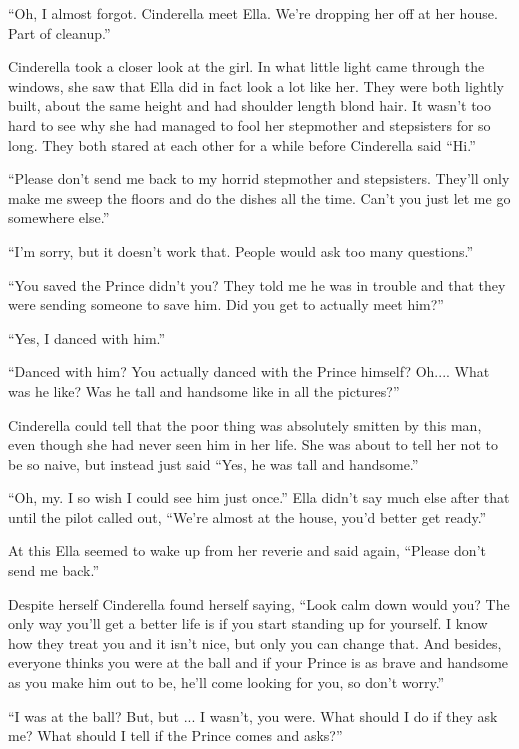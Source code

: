 \documentclass[11pt,letterpaper]{article}
\begin{document}
``Oh, I almost forgot. Cinderella meet Ella. We're dropping her off at her house. Part of cleanup.''

Cinderella took a closer look at the girl. In what little light came through the windows, she saw that Ella did in fact look a lot like her. They were both lightly built, about the same height and had shoulder length blond hair. It wasn't too hard to see why she had managed to fool her stepmother and stepsisters for so long. They both stared at each other for a while before Cinderella said ``Hi.''

``Please don't send me back to my horrid stepmother and stepsisters. They'll only make me sweep the floors and do the dishes all the time. Can't you just let me go somewhere else.''

``I'm sorry, but it doesn't work that. People would ask too many questions.''

``You saved the Prince didn't you? They told me he was in trouble and that they were sending someone to save him. Did you get to actually meet him?''

``Yes, I danced with him.''

``Danced with him? You actually danced with the Prince himself? Oh.... What was he like? Was he tall and handsome like in all the pictures?''

Cinderella could tell that the poor thing was absolutely smitten by this man, even though she had never seen him in her life. She was about to tell her not to be so naive, but instead just said ``Yes, he was tall and handsome.''

``Oh, my. I so wish I could see him just once.'' Ella didn't say much else after that until the pilot called out, ``We're almost at the house, you'd better get ready.''

At this Ella seemed to wake up from her reverie and said again, ``Please don't send me back.''

Despite herself Cinderella found herself saying, ``Look calm down would you? The only way you'll get a better life is if you start standing up for yourself. I know how they treat you and it isn't nice, but only you can change that.  And besides, everyone thinks you were at the ball and if your Prince is as brave and handsome as you make him out to be, he'll come looking for you, so don't worry.''

``I was at the ball? But, but ... I wasn't, you were. What should I do if they ask me? What should I tell if the Prince comes and asks?''
\end{document}
